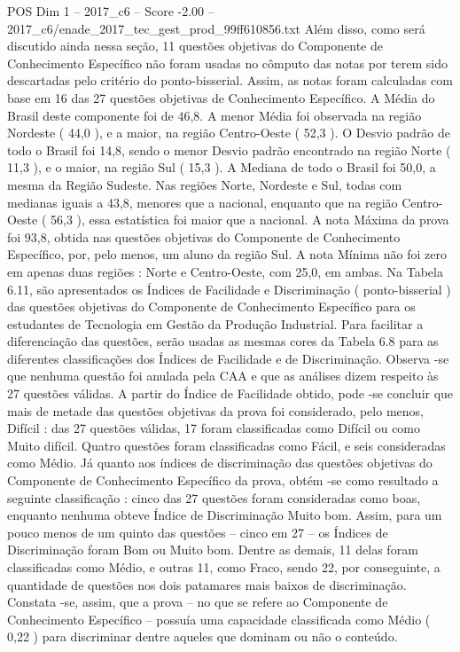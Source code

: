 \begin{textsample}{POS Dim 1 – 2017\_c6 – Score -2.00 – 2017\_c6/enade\_2017\_tec\_gest\_prod\_99ff610856.txt}
Além disso, como será discutido ainda nessa seção, 11 questões objetivas do Componente de Conhecimento Específico não foram usadas no cômputo das notas por terem sido descartadas pelo critério do ponto-bisserial.
Assim, as notas foram calculadas com base em 16 das 27 questões objetivas de Conhecimento Específico.
A Média do Brasil deste componente foi de 46,8.
A menor Média foi observada na região Nordeste ( 44,0 ), e a maior, na região Centro-Oeste ( 52,3 ).
O Desvio padrão de todo o Brasil foi 14,8, sendo o menor Desvio padrão encontrado na região Norte ( 11,3 ), e o maior, na região Sul ( 15,3 ).
A Mediana de todo o Brasil foi 50,0, a mesma da Região Sudeste.
Nas regiões Norte, Nordeste e Sul, todas com medianas iguais a 43,8, menores que a nacional, enquanto que na região Centro-Oeste ( 56,3 ), essa estatística foi maior que a nacional.
A nota Máxima da prova foi 93,8, obtida nas questões objetivas do Componente de Conhecimento Específico, por, pelo menos, um aluno da região Sul.
A nota Mínima não foi zero em apenas duas regiões : Norte e Centro-Oeste, com 25,0, em ambas.
Na Tabela 6.11, são apresentados os Índices de Facilidade e Discriminação ( ponto-bisserial ) das questões objetivas do Componente de Conhecimento Específico para os estudantes de Tecnologia em Gestão da Produção Industrial.
Para facilitar a diferenciação das questões, serão usadas as mesmas cores da Tabela 6.8 para as diferentes classificações dos Índices de Facilidade e de Discriminação.
Observa -se que nenhuma questão foi anulada pela CAA e que as análises dizem respeito às 27 questões válidas.
A partir do Índice de Facilidade obtido, pode -se concluir que mais de metade das questões objetivas da prova foi considerado, pelo menos, Difícil : das 27 questões válidas, 17 foram classificadas como Difícil ou como Muito difícil.
Quatro questões foram classificadas como Fácil, e seis consideradas como Médio.
Já quanto aos índices de discriminação das questões objetivas do Componente de Conhecimento Específico da prova, obtém -se como resultado a seguinte classificação : cinco das 27 questões foram consideradas como boas, enquanto nenhuma obteve Índice de Discriminação Muito bom.
Assim, para um pouco menos de um quinto das questões – cinco em 27 – os Índices de Discriminação foram Bom ou Muito bom.
Dentre as demais, 11 delas foram classificadas como Médio, e outras 11, como Fraco, sendo 22, por conseguinte, a quantidade de questões nos dois patamares mais baixos de discriminação.
Constata -se, assim, que a prova – no que se refere ao Componente de Conhecimento Específico – possuía uma capacidade classificada como Médio ( 0,22 ) para discriminar dentre aqueles que dominam ou não o conteúdo.

\end{textsample}
